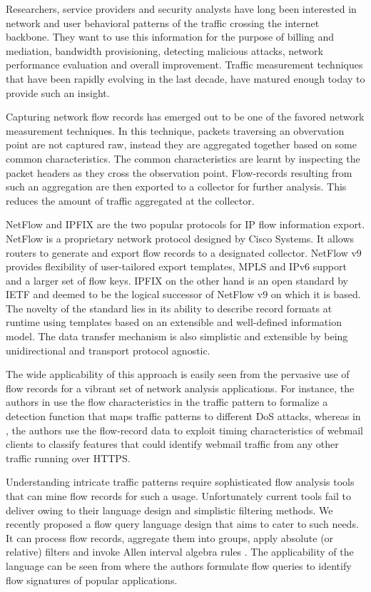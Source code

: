 Researchers, service providers and security analysts have long been interested
in network and user behavioral patterns of the traffic crossing the internet
backbone. They want to use this information for the purpose of billing and
mediation, bandwidth provisioning, detecting malicious attacks, network
performance evaluation and overall improvement. Traffic measurement techniques
that have been rapidly evolving in the last decade, have matured enough today
to provide such an insight.

Capturing network flow records has emerged out to be one of the favored
network measurement techniques. In this technique, packets traversing an
obvervation point are not captured raw, instead they are aggregated together
based on some common characteristics. The common characteristics are learnt by
inspecting the packet headers as they cross the observation point.
Flow-records resulting from such an aggregation are then exported to a
collector for further analysis. This reduces the amount of traffic aggregated
at the collector.

NetFlow and \ac{IPFIX} are the two popular protocols for IP flow information
export. NetFlow \cite{rfc3954} is a proprietary network protocol designed by
Cisco Systems. It allows routers to generate and export flow records to a
designated collector. NetFlow v$9$ provides flexibility of user-tailored
export templates, \ac{MPLS} and IPv$6$ support and a larger set of flow keys.
\ac{IPFIX} \cite{rfc5101} on the other hand is an open standard by IETF and
deemed to be the logical successor of NetFlow v$9$ on which it is based. The
novelty of the standard lies in its ability to describe record formats at
runtime using templates based on an extensible and well-defined information
model. The data transfer mechanism is also simplistic and extensible by being
unidirectional and transport protocol agnostic.

The wide applicability of this approach is easily seen from the pervasive use
of flow records for a vibrant set of network analysis applications. For
instance, the authors in \cite{mkim:2004} use the flow characteristics in the
traffic pattern to formalize a detection function that maps traffic patterns
to different DoS attacks, whereas in \cite{sdominik:2010}, the authors
use the flow-record data to exploit timing characteristics of webmail clients
to classify features that could identify webmail traffic from any other
traffic running over HTTPS.

Understanding intricate traffic patterns require sophisticated flow analysis
tools that can mine flow records for such a usage.  Unfortunately current
tools fail to deliver owing to their language design and simplistic filtering
methods.  We recently proposed a flow query language design
\cite{vmarinov:2009} that aims to cater to such needs.  It can process
flow records, aggregate them into groups, apply absolute (or relative) filters
and invoke Allen interval algebra rules \cite{fallen:1983}. The applicability
of the language can be seen from \cite{vperelman:2011} where the authors
formulate flow queries to identify flow signatures of popular applications.

